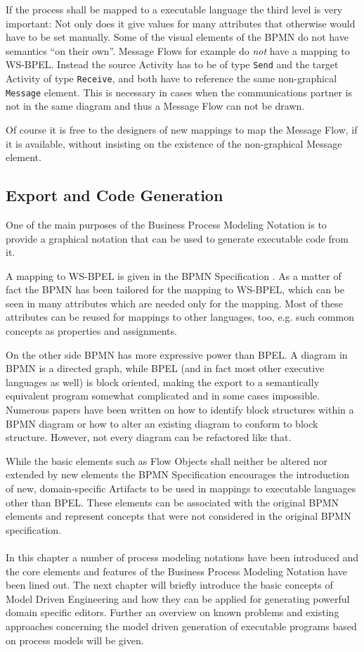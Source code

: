 If the process shall be mapped to a executable language the third level is very important: Not only does it give values for many attributes that otherwise would have to be set manually. Some of the visual elements of the BPMN do not have semantics ``on their own''. Message Flows for example do \emph{not} have a mapping to WS-BPEL. Instead the source Activity has to be of type \verb|Send| and the target Activity of type \verb|Receive|, and both have to reference the same non-graphical \verb|Message| element. This is necessary in cases when the communications partner is not in the same diagram and thus a Message Flow can not be drawn.

Of course it is free to the designers of new mappings to map the Message Flow, if it is available, without insisting on the existence of the non-graphical Message element.


\subsection{Export and Code Generation}

One of the main purposes of the Business Process Modeling Notation is to provide a graphical notation that can be used to generate executable code from it.

A mapping to WS-BPEL is given in the BPMN Specification \cite[Chapter 11]{spec_bpmn}. As a matter of fact the BPMN has been tailored for the mapping to WS-BPEL, which can be seen in many attributes which are needed only for the mapping. Most of these attributes can be reused for mappings to other languages, too, e.g. such common concepts as properties and assignments.

On the other side BPMN has more expressive power than BPEL. A diagram in BPMN is a directed graph, while BPEL (and in fact most other executive languages as well) is block oriented, making the export to a semantically equivalent program somewhat complicated and in some cases impossible. Numerous papers have been written on how to identify block structures within a BPMN diagram or how to alter an existing diagram to conform to block structure. However, not every diagram can be refactored like that.

While the basic elements such as Flow Objects shall neither be altered nor extended by new elements the BPMN Specification encourages the introduction of new, domain-specific Artifacts to be used in mappings to executable languages other than BPEL. These elements can be associated with the original BPMN elements and represent concepts that were not considered in the original BPMN specification.
\\
\\

In this chapter a number of process modeling notations have been introduced and the core elements and features of the Business Process Modeling Notation have been lined out. The next chapter will briefly introduce the basic concepts of Model Driven Engineering and how they can be applied for generating powerful domain specific editors. Further an overview on known problems and existing approaches concerning the model driven generation of executable programs based on process models will be given.
